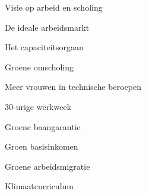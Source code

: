 
\begin{voorstel}{Visie op arbeid en scholing}\end{voorstel}

\begin{voorstel}{De ideale arbeidsmarkt}\end{voorstel}
\begin{voorstel}{Het capaciteitsorgaan}\end{voorstel}
\begin{voorstel}{Groene omscholing}\end{voorstel}
\begin{voorstel}{Meer vrouwen in technische beroepen}\end{voorstel}
\begin{voorstel}{30-urige werkweek}\end{voorstel}
\begin{voorstel}{Groene baangarantie}\end{voorstel}
\begin{voorstel}{Groen basisinkomen}\end{voorstel}
\begin{voorstel}{Groene arbeidsmigratie}\end{voorstel}
\begin{voorstel}{Klimaatcurriculum}\end{voorstel}
